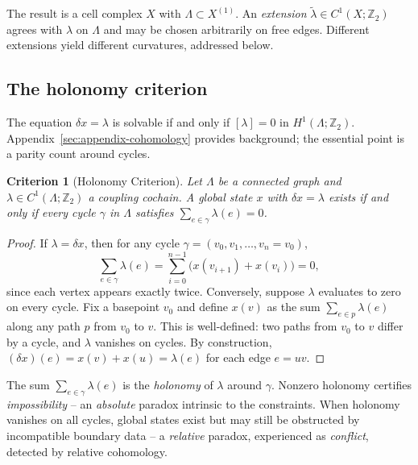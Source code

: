 \documentclass[11pt]{amsart}  %
\theoremstyle{plain}
\newtheorem{criterion}[theorem]{Criterion}
\theoremstyle{definition}
\theoremstyle{remark}
\newcommand{\style}[1]{{\em #1}} %
\newcommand{\coboundary}{\delta} %
\newcommand{\Z}{\mathbb{Z}} %
\newcommand{\cgraph}{\Lambda} %
\newcommand{\coupling}{\lambda} %
\begin{document}
The result is a cell complex $X$ with $\cgraph \subset X^{(1)}$. An \style{extension} $\tilde\coupling \in C^1(X; \Z_2)$ agrees with $\coupling$ on $\cgraph$ and may be chosen arbitrarily on free edges. Different extensions yield different curvatures, addressed below.




\subsection{The holonomy criterion}
\label{sec:holonomy}

The equation $\coboundary x = \coupling$ is solvable if and only if $[\coupling] = 0$ in $H^1(\cgraph; \Z_2)$. Appendix~\ref{sec:appendix-cohomology} provides background; the essential point is a parity count around cycles.

\begin{criterion}[Holonomy Criterion]
\label{crit:holonomy}
Let $\cgraph$ be a connected graph and $\coupling \in C^1(\cgraph; \Z_2)$ a 
coupling cochain. A global state $x$ with $\coboundary x = \coupling$ exists 
if and only if every cycle $\gamma$ in $\cgraph$ satisfies 
$\sum_{e \in \gamma} \coupling(e) = 0$.
\end{criterion}

\begin{proof}
If $\coupling = \coboundary x$, then for any cycle $\gamma = (v_0, v_1, \ldots, v_n = v_0)$,
\[
\sum_{e \in \gamma} \coupling(e) = \sum_{i=0}^{n-1} \bigl(x(v_{i+1}) + x(v_i)\bigr) = 0,
\]
since each vertex appears exactly twice. Conversely, suppose $\coupling$ evaluates 
to zero on every cycle. Fix a basepoint $v_0$ and define $x(v)$ as the sum 
$\sum_{e \in p} \coupling(e)$ along any path $p$ from $v_0$ to $v$. This is 
well-defined: two paths from $v_0$ to $v$ differ by a cycle, and $\coupling$ 
vanishes on cycles. By construction, $(\coboundary x)(e) = x(v) + x(u) = \coupling(e)$ 
for each edge $e = uv$.
\end{proof}

The sum $\sum_{e \in \gamma} \coupling(e)$ is the \style{holonomy} of $\coupling$ around $\gamma$. Nonzero holonomy certifies \style{impossibility} -- an \style{absolute} paradox intrinsic to the constraints. When holonomy vanishes on all cycles, global states exist but may still be obstructed by incompatible boundary data -- a \style{relative} paradox, experienced as \style{conflict}, detected by relative cohomology.
\end{document}
